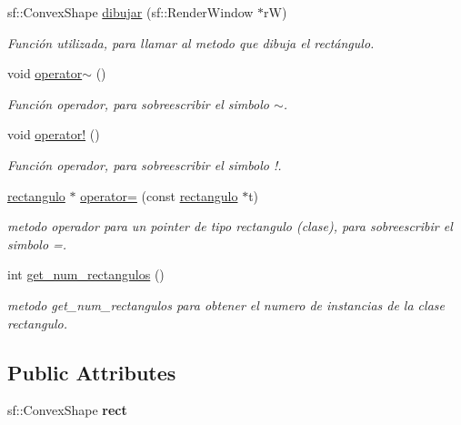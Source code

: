 \begin{DoxyCompactItemize}
sf\+::\+Convex\+Shape \hyperlink{classrectangulo_a43e4169c6127c4c6b58c54081b0370be}{dibujar} (sf\+::\+Render\+Window $\ast$rW)
\begin{DoxyCompactList}\small\item\em Función utilizada, para llamar al metodo que dibuja el rectángulo. \end{DoxyCompactList}\item 
\mbox{\label{classrectangulo_a4cfd02cf92054992c583cc2f5a601c4c}} 
void \hyperlink{classrectangulo_a4cfd02cf92054992c583cc2f5a601c4c}{operator$\sim$} ()
\begin{DoxyCompactList}\small\item\em Función operador, para sobreescribir el simbolo $\sim$. \end{DoxyCompactList}\item 
\mbox{\label{classrectangulo_a319b48b3d2a2229752f39a43a1c87d2c}} 
void \hyperlink{classrectangulo_a319b48b3d2a2229752f39a43a1c87d2c}{operator!} ()
\begin{DoxyCompactList}\small\item\em Función operador, para sobreescribir el simbolo !. \end{DoxyCompactList}\item 
\hyperlink{classrectangulo}{rectangulo} $\ast$ \hyperlink{classrectangulo_a7d8c56fe87e03931cefaa937b4d579ea}{operator=} (const \hyperlink{classrectangulo}{rectangulo} $\ast$t)
\begin{DoxyCompactList}\small\item\em metodo operador para un pointer de tipo rectangulo (clase), para sobreescribir el simbolo =. \end{DoxyCompactList}\item 
\mbox{\label{classrectangulo_aac9d82c3854e707ae12c07eb377bcf10}} 
int \hyperlink{classrectangulo_aac9d82c3854e707ae12c07eb377bcf10}{get\+\_\+num\+\_\+rectangulos} ()
\begin{DoxyCompactList}\small\item\em metodo get\+\_\+num\+\_\+rectangulos para obtener el numero de instancias de la clase rectangulo. \end{DoxyCompactList}\end{DoxyCompactItemize}
\subsection*{Public Attributes}
\begin{DoxyCompactItemize}
\item 
\mbox{\label{classrectangulo_a7ed5010084a638538356fb8b3dabb34c}} 
sf\+::\+Convex\+Shape {\bfseries rect}
\end{DoxyCompactItemize}
